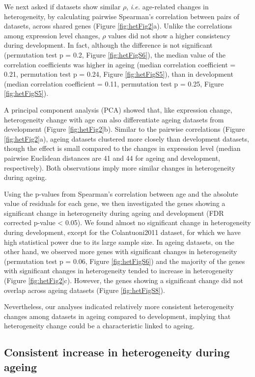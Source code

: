 \documentclass[12pt,twoside]{unicam}
\begin{document}
We next asked if datasets show similar \(\rho\), \emph{i.e.} age-related changes in heterogeneity, by calculating pairwise Spearman's correlation between pairs of datasets, across shared genes (Figure \ref{fig:hetFig2}a). Unlike the correlations among expression level changes, \(\rho\) values did not show a higher consistency during development. In fact, although the difference is not significant (permutation test p = 0.2, Figure \ref{fig:hetFigS6}), the median value of the correlation coefficients was higher in ageing (median correlation coefficient = 0.21, permutation test p = 0.24, Figure \ref{fig:hetFigS5}), than in development (median correlation coefficient = 0.11, permutation test p = 0.25, Figure \ref{fig:hetFigS5}).

A principal component analysis (PCA) showed that, like expression change, heterogeneity change with age can also differentiate ageing datasets from development (Figure \ref{fig:hetFig2}b). Similar to the pairwise correlations (Figure \ref{fig:hetFig2}a), ageing datasets clustered more closely than development datasets, though the effect is small compared to the changes in expression level (median pairwise Euclidean distances are 41 and 44 for ageing and development, respectively). Both observations imply more similar changes in heterogeneity during ageing.

Using the p-values from Spearman's correlation between age and the absolute value of residuals for each gene, we then investigated the genes showing a significant change in heterogeneity during ageing and development (FDR corrected p-value \textless{} 0.05). We found almost no significant change in heterogeneity during development, except for the Colantuoni2011 dataset, for which we have high statistical power due to its large sample size. In ageing datasets, on the other hand, we observed more genes with significant changes in heterogeneity (permutation test p = 0.06, Figure \ref{fig:hetFigS6}) and the majority of the genes with significant changes in heterogeneity tended to increase in heterogeneity (Figure \ref{fig:hetFig2}c). However, the genes showing a significant change did not overlap across ageing datasets (Figure \ref{fig:hetFigS8}).

Nevertheless, our analyses indicated relatively more consistent heterogeneity changes among datasets in ageing compared to development, implying that heterogeneity change could be a characteristic linked to ageing.

\hypertarget{consistent-increase-in-heterogeneity-during-ageing}{%
\subsection{Consistent increase in heterogeneity during ageing}\label{consistent-increase-in-heterogeneity-during-ageing}}
\end{document}

